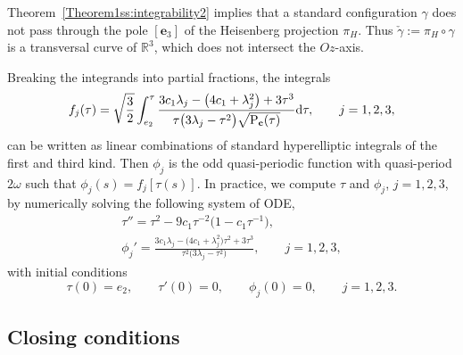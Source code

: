 \documentclass[10pt,a4paper]{amsart}
\numberwithin{equation}{section}
\def\R{\mathbb{R}}
\begin{document}
\begin{Remark}
 Theorem~\ref{Theorem1ss:integrability2} implies that a standard configuration $\gamma$
 does not pass through the pole
 $[\mathbf{e}_3]$
 of the Heisenberg projection $\pi_{H}$. Thus $\check{\gamma}:=\pi_{H}\circ \gamma$ is a transversal curve of $\R^3$,
 which does not
intersect the $Oz$-axis.
 \end{Remark}

 \begin{Remark}%
 Breaking the integrands into partial fractions, the integrals
\[
{f_j(\tau)} =
\sqrt{\frac{3}{2}}\int_{e_2}^{\tau}\frac{3c_1\lambda_j-\big(4c_1+\lambda_j^2\big)
+3\tau^3}{\tau\big(3\lambda_j-\tau^2\big)\sqrt{{\rm P}_{{\bf c}}(\tau)}}{\rm d}\tau,\qquad j=1,2,3,
\]
can be written as linear combinations of standard hyperelliptic integrals of the first and third kind.
Then $\phi_j$ is the odd quasi-periodic function with quasi-period $2\omega$ such that
{$\phi_j(s)=f_j[\tau(s)]$}.
In practice, we compute $\tau$ and $\phi_j$, $j=1,2,3$, by numerically solving the following system of ODE,
\begin{gather}
\tau''=\tau^2-9c_1\tau^{-2}\big(1-c_1\tau^{-1}\big),\nonumber\\
\phi_j'=\frac{3c_1\lambda_j-\big(4c_1+\lambda_j^2\big)\tau^2+3\tau^3}{\tau^2\big(3\lambda_j-\tau^2\big)},\qquad j =1,2,3,\label{nsol}
\end{gather}
with initial conditions
\begin{equation}\label{icon}
 \tau(0)=e_2,\qquad \tau'(0)=0,\qquad \phi_j(0)=0, \qquad j=1,2,3.\end{equation}
 \end{Remark}

\subsection{Closing conditions}%
\end{document}
